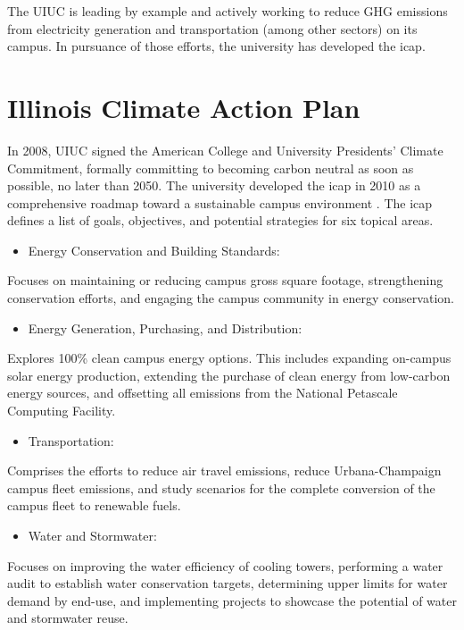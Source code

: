 The \gls{UIUC} is leading by example and actively working to reduce \gls{GHG} emissions from electricity generation and transportation (among other sectors) on its campus.
In pursuance of those efforts, the university has developed the \gls{icap}.

\section{Illinois Climate Action Plan}
In 2008, \gls{UIUC} signed the American College and University Presidents' Climate Commitment, formally committing to becoming carbon neutral as soon as possible, no later than 2050.
The university developed the \gls{icap} in 2010 as a comprehensive roadmap toward a sustainable campus environment \cite{university_of_illinois_at_urbana-champaign_illlinois_2015}.
The \gls{icap} defines a list of goals, objectives, and potential strategies for six topical areas.

\begin{itemize}
	\item Energy Conservation and Building Standards:
\end{itemize}
Focuses on maintaining or reducing campus gross square footage, strengthening conservation efforts, and engaging the campus community in energy conservation.

\begin{itemize}
	\item Energy Generation, Purchasing, and Distribution:
\end{itemize}
Explores 100\% clean campus energy options.
This includes expanding on-campus solar energy production, extending the purchase of clean energy from low-carbon energy sources, and offsetting all emissions from the National Petascale Computing Facility.

\begin{itemize}
	\item Transportation:
\end{itemize}
Comprises the efforts to reduce air travel emissions, reduce Urbana-Champaign campus fleet emissions, and study scenarios for the complete conversion of the campus fleet to renewable fuels.

\begin{itemize}
	\item Water and Stormwater:
\end{itemize}
Focuses on improving the water efficiency of cooling towers, performing a water audit to establish water conservation targets, determining upper limits for water demand by end-use, and implementing projects to showcase the potential of water and stormwater reuse.

